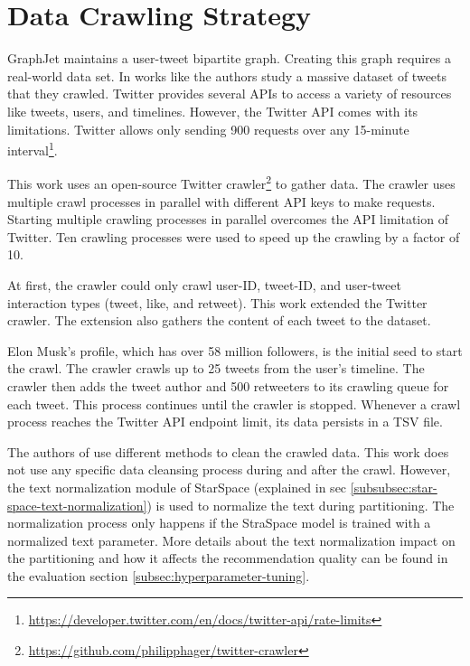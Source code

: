 \section{Data Crawling Strategy}
\label{sec:data-crawling-strategy}

GraphJet maintains a user-tweet bipartite graph. Creating this graph requires a real-world data set. In works like \cite{kwakWhatTwitterSocial2010} the authors study a massive dataset of tweets that they crawled. Twitter provides several APIs to access a variety of resources like tweets, users, and timelines. However, the Twitter API comes with its limitations. Twitter allows only sending 900 requests over any 15-minute interval\footnote{\url{https://developer.twitter.com/en/docs/twitter-api/rate-limits}}. 


This work uses an open-source Twitter crawler\footnote{\url{https://github.com/philipphager/twitter-crawler}} to gather data. The crawler uses multiple crawl processes in parallel with different API keys to make requests. Starting multiple crawling processes in parallel overcomes the API limitation of Twitter. Ten crawling processes were used to speed up the crawling by a factor of 10. 


At first, the crawler could only crawl user-ID, tweet-ID, and user-tweet interaction types (tweet, like, and retweet). This work extended the Twitter crawler. The extension also gathers the content of each tweet to the dataset. 


Elon Musk's profile, which has over 58 million followers, is the initial seed to start the crawl. The crawler crawls up to 25 tweets from the user's timeline. The crawler then adds the tweet author and 500 retweeters to its crawling queue for each tweet. This process continues until the crawler is stopped. Whenever a crawl process reaches the Twitter API endpoint limit, its data persists in a TSV file.


The authors of \cite{kwakWhatTwitterSocial2010} use different methods to clean the crawled data. This work does not use any specific data cleansing process during and after the crawl. However, the text normalization module of StarSpace (explained in sec \ref{subsubsec:star-space-text-normalization}) is used to normalize the text during partitioning. The normalization process only happens if the StraSpace model is trained with a normalized text parameter. More details about the text normalization impact on the partitioning and how it affects the recommendation quality can be found in the evaluation section \ref{subsec:hyperparameter-tuning}.


